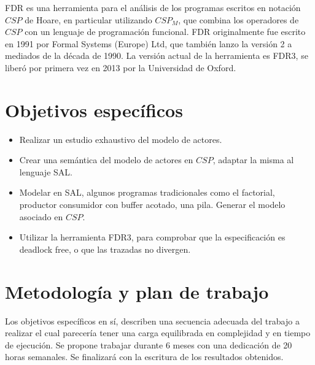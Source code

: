 \documentclass{article}
\begin{document}
FDR es una herramienta para el análisis de los programas escritos en notación $CSP$ de Hoare, en particular utilizando $CSP_M$, que combina los operadores de $CSP$ con un lenguaje de programación funcional. FDR originalmente fue escrito en 1991 por Formal Systems (Europe) Ltd, que también lanzo la versión 2 a mediados de la década de 1990. La versión actual de la herramienta es FDR3, se liberó por primera vez en 2013 por la Universidad de Oxford.

\section{Objetivos específicos}

\begin{itemize}

  \item Realizar un estudio exhaustivo del modelo de actores. 
  \item Crear una semántica del modelo de actores en $CSP$, adaptar la misma al lenguaje SAL.
  \item Modelar en SAL, algunos programas tradicionales como el factorial, productor consumidor con buffer acotado, una pila. Generar el modelo asociado en $CSP$.
  \item Utilizar la  herramienta FDR3, para comprobar que la especificación es deadlock free, o que las trazadas no divergen.  

\end{itemize}


\section{Metodología y plan de trabajo}

Los objetivos específicos en sí, describen una secuencia adecuada del trabajo a realizar el cual parecería tener una carga equilibrada en complejidad y en tiempo de ejecución. Se propone trabajar durante 6 meses con una dedicación de 20 horas semanales. Se finalizará con la escritura de los resultados obtenidos.

{}

\end{document}
